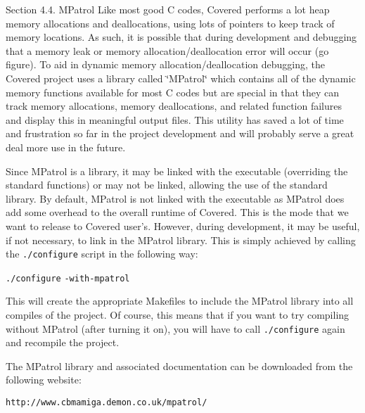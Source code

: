 \begin{Desc}
\item[Section 4.4. MPatrol]Like most good C codes, Covered performs a lot heap memory allocations and deallocations, using lots of pointers to keep track of memory locations. As such, it is possible that during development and debugging that a memory leak or memory allocation/deallocation error will occur (go figure). To aid in dynamic memory allocation/deallocation debugging, the Covered project uses a library called \char`\"{}MPatrol\char`\"{} which contains all of the dynamic memory functions available for most C codes but are special in that they can track memory allocations, memory deallocations, and related function failures and display this in meaningful output files. This utility has saved a lot of time and frustration so far in the project development and will probably serve a great deal more use in the future.\end{Desc}
\begin{Desc}
\item[]Since MPatrol is a library, it may be linked with the executable (overriding the standard functions) or may not be linked, allowing the use of the standard library. By default, MPatrol is not linked with the executable as MPatrol does add some overhead to the overall runtime of Covered. This is the mode that we want to release to Covered user's. However, during development, it may be useful, if not necessary, to link in the MPatrol library. This is simply achieved by calling the {\tt ./configure}  script in the following way:\end{Desc}
\begin{Desc}
\item[]{\tt ./configure}  {\tt -with-mpatrol}  \end{Desc}
\begin{Desc}
\item[]This will create the appropriate Makefiles to include the MPatrol library into all compiles of the project. Of course, this means that if you want to try compiling without MPatrol (after turning it on), you will have to call {\tt ./configure}  again and recompile the project.\end{Desc}
\begin{Desc}
\item[]The MPatrol library and associated documentation can be downloaded from the following website:\end{Desc}
\begin{Desc}
\item[]{\tt http://www.cbmamiga.demon.co.uk/mpatrol/}\end{Desc}




